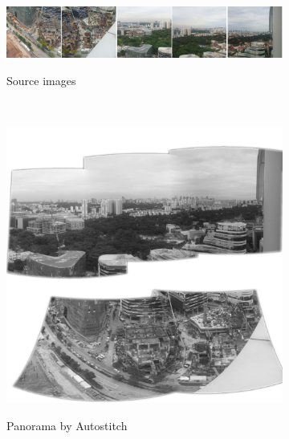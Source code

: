 \documentclass{article}
\begin{document}
\begin{figure}[h]
	\begin{subfigure}[t]{0.9\textwidth}
		\centering
        \includegraphics[width=\textwidth]{images/pano_wide}
        \label{fig:pano_images}
		\caption{Source images}
    \end{subfigure}%
	\\
	\centering
    \begin{subfigure}[b]{0.4\textwidth}
		\includegraphics[width=\textwidth]{images/panorama-autostitch}
        \label{fig:pano_autostitch}
		\caption{Panorama by Autostitch}
    \end{subfigure}%
	~%
    \begin{subfigure}[b]{0.4\textwidth}

\end{subfigure}
\end{figure}
\end{document}
